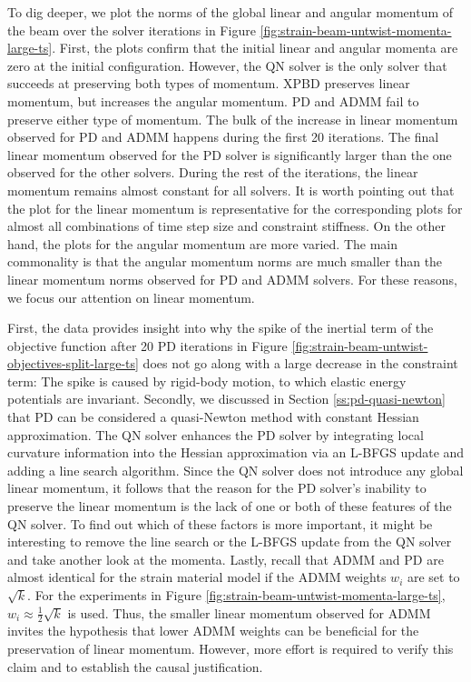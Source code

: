 To dig deeper, we plot the norms of the global linear and angular momentum of the beam over the solver iterations in 
Figure \ref{fig:strain-beam-untwist-momenta-large-ts}. First, the plots confirm that the initial linear and angular momenta are zero at the initial 
configuration. However, the QN solver is the only solver that succeeds at preserving both types of momentum. XPBD preserves linear momentum, 
but increases the angular momentum. PD and ADMM fail to preserve either type of momentum. The bulk of the 
increase in linear momentum observed for PD and ADMM happens during the first 20 iterations. The final linear momentum observed for the PD solver is 
significantly larger than the one observed for the other solvers. During the rest of the iterations, the linear momentum remains almost constant for all solvers. 
It is worth pointing out that the plot for the linear momentum is representative for the corresponding plots for almost all combinations of time step size and 
constraint stiffness. On the other hand, the plots for the angular momentum are more varied. The main commonality is that the angular momentum norms are much 
smaller than the linear momentum norms observed for PD and ADMM solvers. For these reasons, we focus our attention on linear momentum. 

First, the data provides insight into why the spike of the inertial term of the objective function after 20 PD iterations in 
Figure \ref{fig:strain-beam-untwist-objectives-split-large-ts} does not go along with a large decrease in the constraint term: The spike is caused by 
rigid-body motion, to which elastic energy potentials are invariant. Secondly, we discussed in Section \ref{ss:pd-quasi-newton} that PD can be considered 
a quasi-Newton method with constant Hessian approximation. The QN solver enhances the PD solver by integrating local curvature information into the Hessian 
approximation via an L-BFGS update and adding a line search algorithm. Since the QN solver does not introduce any global linear momentum, it follows that
the reason for the PD solver's inability to preserve the linear momentum is the lack of one or both of these features of the QN solver. To find out which of 
these factors is more important, it might be interesting to remove the line search or the L-BFGS update from the QN solver and take another look at the momenta. 
Lastly, recall that ADMM and PD are almost identical for the strain material model if the ADMM weights $w_i$ are set to $\sqrt{k}$. For the experiments in 
Figure \ref{fig:strain-beam-untwist-momenta-large-ts}, $w_i \approx \frac{1}{2}\sqrt{k}$ is used. Thus, the smaller linear momentum observed for ADMM invites 
the hypothesis that lower ADMM weights can be beneficial for the preservation of linear momentum. However, more effort is required to verify this claim and 
to establish the causal justification. 

